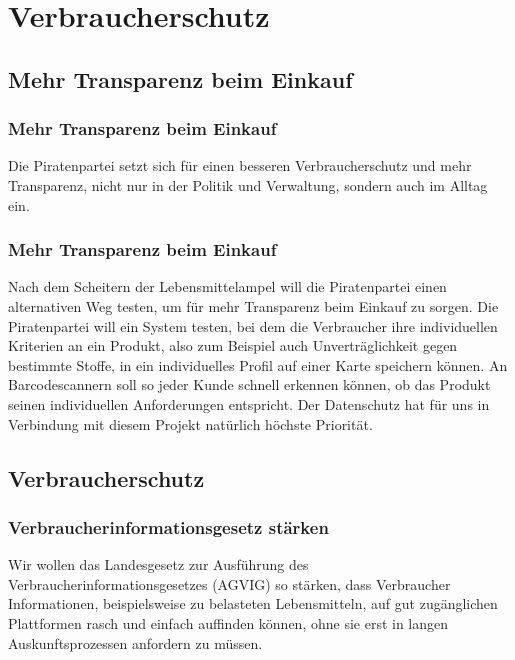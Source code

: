 \section{Verbraucherschutz}

\subsection*{Mehr Transparenz beim Einkauf}
\subsubsection{Mehr Transparenz beim Einkauf}
\abstimmung
Die Piratenpartei setzt sich für einen besseren Verbraucherschutz und mehr Transparenz, nicht nur in der Politik und Verwaltung, sondern auch im Alltag ein.
 
\subsubsection{Mehr Transparenz beim Einkauf}
\abstimmung
Nach dem Scheitern der Lebensmittelampel will die Piratenpartei einen alternativen Weg testen, um für mehr Transparenz beim Einkauf zu sorgen. Die Piratenpartei will ein System testen, bei dem die Verbraucher ihre individuellen Kriterien an ein Produkt, also zum Beispiel auch Unverträglichkeit gegen bestimmte Stoffe, in ein individuelles Profil auf einer Karte speichern können. An Barcodescannern soll so jeder Kunde schnell erkennen können, ob das Produkt seinen individuellen Anforderungen entspricht. Der Datenschutz hat für uns in Verbindung mit diesem Projekt natürlich höchste Priorität.
 
\subsection*{Verbraucherschutz}
\subsubsection{Verbraucherinformationsgesetz stärken}
\abstimmung
Wir wollen das Landesgesetz zur Ausführung des Verbraucherinformationsgesetzes (AGVIG) so stärken, dass Verbraucher Informationen, beispielsweise zu belasteten Lebensmitteln, auf gut zugänglichen Plattformen rasch und einfach auffinden können, ohne sie erst in langen Auskunftsprozessen anfordern zu müssen.
 
